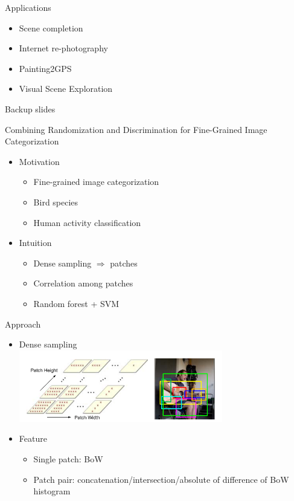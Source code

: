 \documentclass[12pt]{beamer}
\begin{document}
\begin{frame}{Applications}
	\begin{itemize}
		\item Scene completion
		\item Internet re-photography
		\item Painting2GPS
		\item Visual Scene Exploration
	\end{itemize}
\end{frame}

\begin{frame}{Backup slides}
\end{frame}

\begin{frame}{Combining Randomization and Discrimination for Fine-Grained Image Categorization}
    \begin{itemize}
        \item Motivation
        \begin{itemize}
            \item Fine-grained image categorization
            \item Bird species
            \item Human activity classification
        \end{itemize}
        \item Intuition
        \begin{itemize}
            \item Dense sampling $\Rightarrow$ patches
            \item Correlation among patches
            \item Random forest + SVM
        \end{itemize}
    \end{itemize}
\end{frame}

\begin{frame}{Approach}
    \begin{itemize}
        \item Dense sampling \\
        \medskip
        { \includegraphics[width=0.7\textwidth]{fffig2.png} } \\
        \item Feature
        \begin{itemize}
            \item Single patch: BoW
            \item Patch pair: concatenation/intersection/absolute of difference of BoW histogram
        \end{itemize} 
    \end{itemize}
\end{frame}
\end{document}
